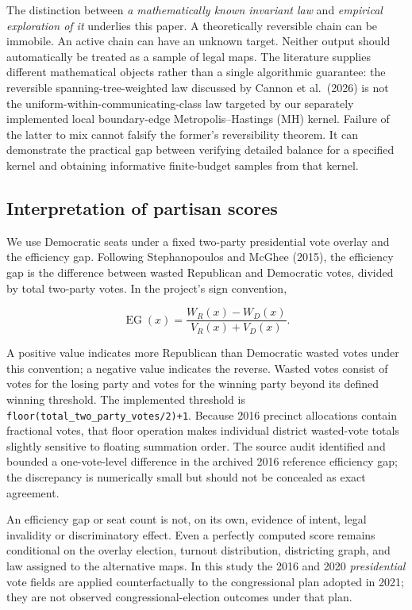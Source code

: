 \documentclass[
  10pt,
]{article}
\begin{document}
The distinction between \emph{a mathematically known invariant law} and
\emph{empirical exploration of it} underlies this paper. A theoretically
reversible chain can be immobile. An active chain can have an unknown
target. Neither output should automatically be treated as a sample of
legal maps. The literature supplies different mathematical objects
rather than a single algorithmic guarantee: the reversible
spanning-tree-weighted law discussed by Cannon et al.~(2026) is not the
uniform-within-communicating-class law targeted by our separately
implemented local boundary-edge Metropolis--Hastings (MH) kernel.
Failure of the latter to mix cannot falsify the former's reversibility
theorem. It can demonstrate the practical gap between verifying detailed
balance for a specified kernel and obtaining informative finite-budget
samples from that kernel.

\hypertarget{interpretation-of-partisan-scores}{%
\subsection{Interpretation of partisan
scores}\label{interpretation-of-partisan-scores}}

We use Democratic seats under a fixed two-party presidential vote
overlay and the efficiency gap. Following Stephanopoulos and McGhee
(2015), the efficiency gap is the difference between wasted Republican
and Democratic votes, divided by total two-party votes. In the project's
sign convention,

\begin{equation}
\operatorname{EG}(x)
=\frac{W_R(x)-W_D(x)}{V_R(x)+V_D(x)}.
\end{equation}

A positive value indicates more Republican than Democratic wasted votes
under this convention; a negative value indicates the reverse. Wasted
votes consist of votes for the losing party and votes for the winning
party beyond its defined winning threshold. The implemented threshold is
\texttt{floor(total\_two\_party\_votes/2)+1}. Because 2016 precinct
allocations contain fractional votes, that floor operation makes
individual district wasted-vote totals slightly sensitive to floating
summation order. The source audit identified and bounded a
one-vote-level difference in the archived 2016 reference efficiency gap;
the discrepancy is numerically small but should not be concealed as
exact agreement.

An efficiency gap or seat count is not, on its own, evidence of intent,
legal invalidity or discriminatory effect. Even a perfectly computed
score remains conditional on the overlay election, turnout distribution,
districting graph, and law assigned to the alternative maps. In this
study the 2016 and 2020 \emph{presidential} vote fields are applied
counterfactually to the congressional plan adopted in 2021; they are not
observed congressional-election outcomes under that plan.
\end{document}
